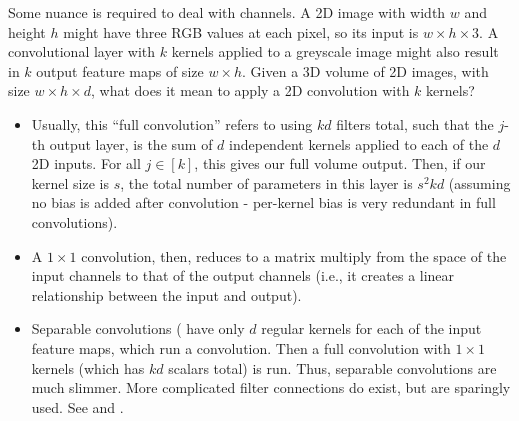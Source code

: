 \documentclass{article}
\begin{document}
Some nuance is required to deal with channels. A 2D image with width $w$ and height $h$ might have three RGB values at each pixel, so its input is $w\times h\times 3$. A convolutional layer with $k$ kernels applied to a greyscale image might also result in $k$ output feature maps of size $w\times h$. Given a 3D volume of 2D images, with size $w\times h\times d$, what does it mean to apply a 2D convolution with $k$ kernels?
\begin{itemize}
\item Usually, this ``full convolution'' refers to using $kd$ filters total, such that the $j$-th output layer, is the sum of $d$ independent kernels applied to each of the $d$ 2D inputs. For all $j\in[k]$, this gives our full volume output. Then, if our kernel size is $s$, the total number of parameters in this layer is $s^2kd$ (assuming no bias is added after convolution - per-kernel bias is very redundant in full convolutions).
\item A $1\times 1$ convolution, then, reduces to a matrix multiply from the space of the input channels to that of the output channels (i.e., it creates a linear relationship between the input and output).
  \item  Separable convolutions ( have only $d$ regular kernels for each of the input feature maps, which run a convolution. Then a full convolution with $1\times 1$ kernels (which has $kd$ scalars total) is run. Thus, separable convolutions are much slimmer. More complicated filter connections do exist, but are sparingly used. See  and .
\end{itemize}
\end{document}
